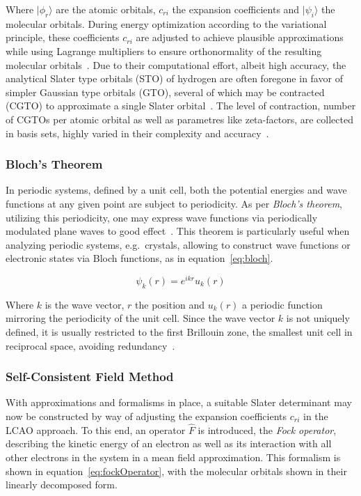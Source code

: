 \documentclass[12pt]{article}
\begin{document}
\bigskip

\noindent Where $|\phi_{r}\rangle$ are the atomic orbitals, $c_{r i}$ the expansion coefficients and $|\psi_i\rangle$ the molecular orbitals.
During energy optimization according to the variational principle, these coefficients $c_{r i}$ are adjusted to achieve plausible approximations while using Lagrange multipliers to ensure orthonormality of the resulting molecular orbitals~\cite{sherrill2000introduction}.
Due to their computational effort, albeit high accuracy, the analytical Slater type orbitals (STO) of hydrogen are often foregone in favor of simpler Gaussian type orbitals (GTO), several of which may be contracted (CGTO) to approximate a single Slater orbital~\cite{Boys1950}. 
The level of contraction, number of CGTOs per atomic orbital as well as parametres like zeta-factors, are collected in basis sets, highly varied in their complexity and accuracy~\cite{Huzinaga1985}.

\subsubsection{Bloch's Theorem}
In periodic systems, defined by a unit cell, both the potential energies and wave functions at any given point are subject to periodicity.
As per \textit{Bloch's theorem}, utilizing this periodicity, one may express wave functions via periodically modulated plane waves to good effect~\cite{Bloch1929}.
This theorem is particularly useful when analyzing periodic systems, e.g.~crystals, allowing to construct wave functions or electronic states via Bloch functions, as in equation~\ref{eq:bloch}.

\begin{equation}
  \psi_{k}(r) = e^{ikr}u_{k}(r)
  \label{eq:bloch}
\end{equation}

\bigskip

\noindent Where $k$ is the wave vector, $r$ the position and $u_{k}(r)$ a periodic function mirroring the periodicity of the unit cell.
Since the wave vector $k$ is not uniquely defined, it is usually restricted to the first Brillouin zone, the smallest unit cell in reciprocal space, avoiding redundancy~\cite{Ashcroft1976-ra}.

\subsubsection{Self-Consistent Field Method}
With approximations and formalisms in place, a suitable Slater determinant may now be constructed by way of adjusting the expansion coefficients $c_{r i}$ in the LCAO approach.
To this end, an operator $\hat{F}$ is introduced, the \textit{Fock operator}, describing the kinetic energy of an electron as well as its interaction with all other electrons in the system in a mean field approximation.
This formalism is shown in equation~\ref{eq:fockOperator}, with the molecular orbitals shown in their linearly decomposed form.
\end{document}
